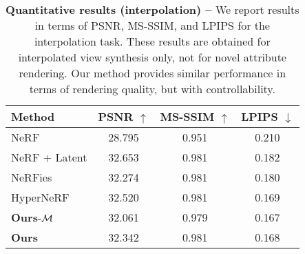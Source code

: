 \begin{table}
  \centering
  \begin{tabular}{@{}lccc@{}}
    \toprule
    Method                     & PSNR $\uparrow$ & MS-SSIM $\uparrow$ & LPIPS $\downarrow$ \\
    \midrule
    NeRF                       & 28.795          & 0.951              & 0.210              \\
    NeRF + Latent              & 32.653          & 0.981              & 0.182              \\
    NeRFies                    & 32.274          & 0.981              & 0.180              \\
    HyperNeRF                  & 32.520          & 0.981              & 0.169              \\
    \midrule
    \textbf{Ours}{-}$\mathcal{M}$ & 32.061          & 0.979              & 0.167              \\
    \textbf{Ours}              & 32.342          & 0.981              & 0.168              \\

    \bottomrule
  \end{tabular}
  \caption{
    \textbf{Quantitative results (interpolation) -- }
    We report results in terms of PSNR, MS-SSIM, and LPIPS for the
    interpolation task.
    These results are obtained for interpolated view synthesis only, not for
    novel attribute rendering.
    Our method provides similar performance in terms of rendering quality, but
    with controllability.
  } %
  \label{tab:conerf-sota}
\end{table}